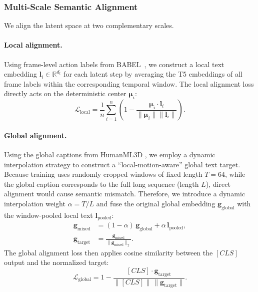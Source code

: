 \documentclass{article}
\begin{document}
\subsubsection{Multi-Scale Semantic Alignment}

We align the latent space at two complementary scales.

\paragraph{Local alignment.}
Using frame-level action labels from BABEL~\citep{punnakkal2021babel}, we construct a local
text embedding \(\mathbf{l}_i \in \mathbb{R}^{d_t}\) for each latent step by averaging the
T5 embeddings of all frame labels within the corresponding temporal window. The local
alignment loss directly acts on the deterministic center \(\boldsymbol{\mu}_i\):
\begin{equation}
\mathcal{L}_{\text{local}} = \frac{1}{n} \sum_{i=1}^{n}
\left(1 - \frac{\boldsymbol{\mu}_i \cdot \mathbf{l}_i}
{\|\boldsymbol{\mu}_i\| \|\mathbf{l}_i\|}\right).
\label{eq:loss-local}
\end{equation}

\paragraph{Global alignment.}
Using the global captions from HumanML3D \citep{Guo_2022_CVPR}, we employ a dynamic interpolation strategy to construct a ``local-motion-aware'' global text target. Because training uses randomly cropped windows of fixed length \(T=64\), while the global caption corresponds to the full long sequence (length \(L\)), direct alignment would cause semantic mismatch. Therefore, we introduce a dynamic interpolation weight \(\alpha = T/L\) and fuse the original global embedding \(\mathbf{g}_{\text{global}}\) with the window-pooled local text \(\mathbf{l}_{\text{pooled}}\):
    \begin{align}
    \mathbf{g}_{\text{mixed}} &= (1-\alpha)\,\mathbf{g}_{\text{global}} + \alpha\,\mathbf{l}_{\text{pooled}}, \label{eq:g-mixed}\\
    \mathbf{g}_{\text{target}} &= \frac{\mathbf{g}_{\text{mixed}}}{\|\mathbf{g}_{\text{mixed}}\|_2}.
    \label{eq:g-target}
    \end{align}
    The global alignment loss then applies cosine similarity between the \([CLS]\) output and the normalized target:
    \begin{equation}
    \mathcal{L}_{\text{global}} = 1 - \frac{[CLS] \cdot \mathbf{g}_{\text{target}}}{\|[CLS]\| \, \|\mathbf{g}_{\text{target}}\|}.
    \label{eq:loss-global}
    \end{equation}
\end{document}
